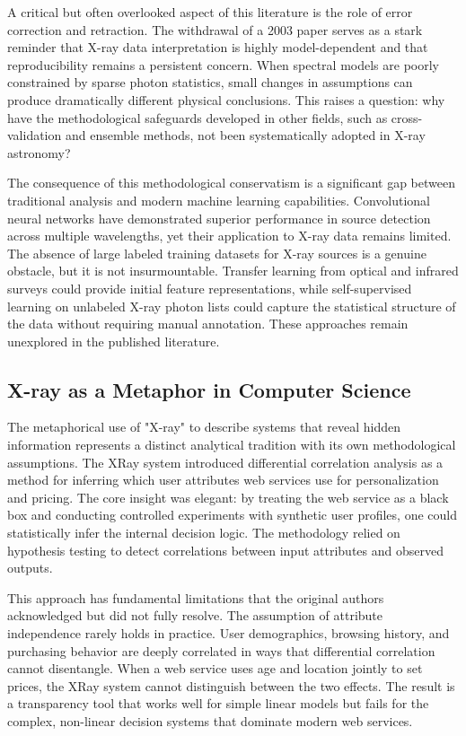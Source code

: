 \documentclass[conference]{IEEEtran}
\begin{document}
A critical but often overlooked aspect of this literature is the role of error correction and retraction. The withdrawal of a 2003 paper \cite{r2} serves as a stark reminder that X-ray data interpretation is highly model-dependent and that reproducibility remains a persistent concern. When spectral models are poorly constrained by sparse photon statistics, small changes in assumptions can produce dramatically different physical conclusions. This raises a question: why have the methodological safeguards developed in other fields, such as cross-validation and ensemble methods, not been systematically adopted in X-ray astronomy?

The consequence of this methodological conservatism is a significant gap between traditional analysis and modern machine learning capabilities. Convolutional neural networks have demonstrated superior performance in source detection across multiple wavelengths, yet their application to X-ray data remains limited. The absence of large labeled training datasets for X-ray sources is a genuine obstacle, but it is not insurmountable. Transfer learning from optical and infrared surveys could provide initial feature representations, while self-supervised learning on unlabeled X-ray photon lists could capture the statistical structure of the data without requiring manual annotation. These approaches remain unexplored in the published literature.

\subsection{X-ray as a Metaphor in Computer Science}

The metaphorical use of "X-ray" to describe systems that reveal hidden information represents a distinct analytical tradition with its own methodological assumptions. The XRay system \cite{r3} introduced differential correlation analysis as a method for inferring which user attributes web services use for personalization and pricing. The core insight was elegant: by treating the web service as a black box and conducting controlled experiments with synthetic user profiles, one could statistically infer the internal decision logic. The methodology relied on hypothesis testing to detect correlations between input attributes and observed outputs.

This approach has fundamental limitations that the original authors acknowledged but did not fully resolve. The assumption of attribute independence rarely holds in practice. User demographics, browsing history, and purchasing behavior are deeply correlated in ways that differential correlation cannot disentangle. When a web service uses age and location jointly to set prices, the XRay system cannot distinguish between the two effects. The result is a transparency tool that works well for simple linear models but fails for the complex, non-linear decision systems that dominate modern web services.
\end{document}
